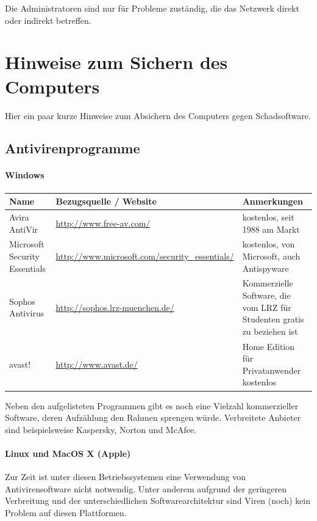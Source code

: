 \documentclass[a4paper,12pt]{scrartcl}
\begin{document}
Die Administratoren sind nur für Probleme zuständig, die das Netzwerk direkt oder indirekt betreffen. 

\newpage
\section*{Hinweise zum Sichern des Computers}

Hier ein paar kurze Hinweise zum Absichern des Computers gegen Schadsoftware.

\subsection*{Antivirenprogramme}
\paragraph*{Windows}
\begin{center}
  \begin{tabularx}{\linewidth}{|p{.2\linewidth}XX|}
    \hline
    Name & Bezugsquelle / Website & Anmerkungen\\
    \hline \hline
    Avira AntiVir & \url{http://www.free-av.com/} & kostenlos, seit 1988 am Markt\\
    \hline
    Microsoft Security Essentials & \url{http://www.microsoft.com/security\_essentials/} & kostenlos, von Microsoft, auch Antispyware\\
    \hline
    Sophos Antivirus & \url{http://sophos.lrz-muenchen.de/} & Kommerzielle Software, die vom LRZ für Studenten gratis zu beziehen ist\\
    \hline
    avast! & \url{http://www.avast.de/} & Home Edition für Privatanwender kostenlos\\
    \hline
  \end{tabularx}
\end{center}

Neben den aufgelisteten Programmen gibt es noch eine Vielzahl kommerzieller Software, deren Aufzählung den Rahmen sprengen würde. Verbreitete Anbieter sind beispielsweise Kaspersky, Norton und McAfee.

\paragraph*{Linux und MacOS X (Apple)}

Zur Zeit ist unter diesen Betriebssystemen eine Verwendung von Antivirensoftware nicht notwendig. Unter anderem aufgrund der geringeren Verbreitung und der unterschiedlichen Softwarearchitektur sind Viren (noch) kein Problem auf diesen Plattformen.
\end{document}
